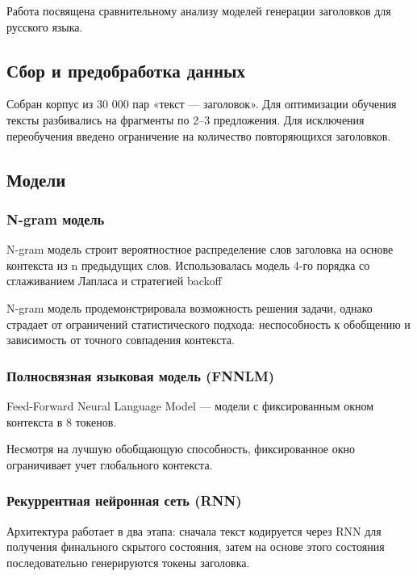 \documentclass[coursework]{SCWorks}
\begin{document}
    Работа посвящена сравнительному анализу моделей генерации заголовков для русского языка.

    \subsection{Сбор и предобработка данных}

    Собран корпус из 30 000 пар «текст — заголовок».
    Для оптимизации обучения тексты разбивались на фрагменты по 2–3 предложения.
    Для исключения переобучения введено ограничение на количество повторяющихся заголовков.

    \subsection{Модели}

    \subsubsection{N-gram модель}

    N-gram модель строит вероятностное распределение слов заголовка на основе контекста из n предыдущих слов.
    Использовалась модель 4-го порядка со сглаживанием Лапласа и стратегией backoff

    N-gram модель продемонстрировала возможность решения задачи, однако страдает от ограничений
    статистического подхода: неспособность к обобщению и зависимость от точного совпадения контекста.

    \subsubsection{Полносвязная языковая модель (FNNLM)}

    Feed-Forward Neural Language Model — модели с фиксированным окном контекста в 8 токенов.

    Несмотря на лучшую обобщающую способность, фиксированное окно ограничивает учет глобального контекста.

    \subsubsection{Рекуррентная нейронная сеть (RNN)}

    Архитектура работает в два этапа: сначала текст кодируется через RNN для получения финального скрытого состояния, затем
    на основе этого состояния последовательно генерируются токены заголовка.
\end{document}

